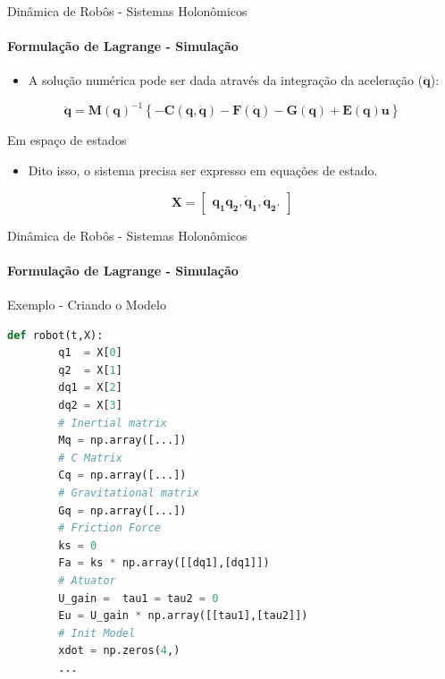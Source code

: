 \documentclass[aspectratio=169]{beamer}
\begin{document}
\begin{frame}{Dinâmica de Robôs - Sistemas Holonômicos}
    \framesubtitle{Formulação de Lagrange - Simulação}
    \begin{itemize}
        \item A solução numérica pode ser dada através da integração da aceleração ($\mathbf{\ddot{q}}$):
    \end{itemize}
    \begin{equation}
        \mathbf{\ddot{q}}=\mathbf{M(q)}^{-1}\left\{\mathbf{-C(q, \dot{q})-F(\dot{q})-G(q) + E(q)u}\right\}
    \end{equation}

    \begin{block}{Em espaço de estados}
        \begin{itemize}
            \item Dito isso, o sistema precisa ser expresso em equações de estado.
        \end{itemize}


        \begin{equation*}
            \mathbf{X} = 
            \begin{bmatrix}
                \mathbf{q_1 q_2, \dot{q}_1, \dot{q}_2}.  
            \end{bmatrix}
        \end{equation*}
    \end{block}
\end{frame}


\begin{frame}[fragile]{Dinâmica de Robôs - Sistemas Holonômicos}
    \framesubtitle{Formulação de Lagrange - Simulação}
    Exemplo - Criando o Modelo
	\begin{lstlisting}[language=Python]
    def robot(t,X):
        q1  = X[0]
        q2  = X[1]
        dq1 = X[2] 
        dq2 = X[3]
        # Inertial matrix
        Mq = np.array([...]) 
        # C Matrix
        Cq = np.array([...])
        # Gravitational matrix 
        Gq = np.array([...])
        # Friction Force
        ks = 0
        Fa = ks * np.array([[dq1],[dq1]])
        # Atuator
        U_gain =  tau1 = tau2 = 0
        Eu = U_gain * np.array([[tau1],[tau2]])
        # Init Model
        xdot = np.zeros(4,)
        ...
	\end{lstlisting}
\end{frame}
\end{document}
